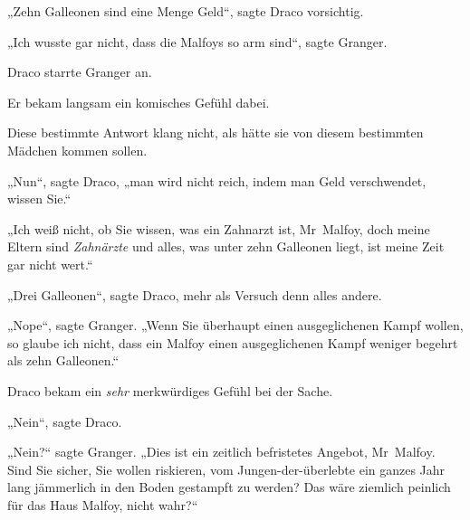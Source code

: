 „Zehn Galleonen sind eine Menge Geld“, sagte Draco vorsichtig.

„Ich wusste gar nicht, dass die Malfoys so arm sind“, sagte Granger.

Draco starrte Granger an.

Er bekam langsam ein komisches Gefühl dabei.

Diese bestimmte Antwort klang nicht, als hätte sie von diesem bestimmten Mädchen kommen sollen.

„Nun“, sagte Draco, „man wird nicht reich, indem man Geld verschwendet, wissen Sie.“

„Ich weiß nicht, ob Sie wissen, was ein Zahnarzt ist, Mr~Malfoy, doch meine Eltern sind \emph{Zahnärzte} und alles, was unter zehn Galleonen liegt, ist meine Zeit gar nicht wert.“

„Drei Galleonen“, sagte Draco, mehr als Versuch denn alles andere.

„Nope“, sagte Granger. „Wenn Sie überhaupt einen ausgeglichenen Kampf wollen, so glaube ich nicht, dass ein Malfoy einen ausgeglichenen Kampf weniger begehrt als zehn Galleonen.“

Draco bekam ein \emph{sehr} merkwürdiges Gefühl bei der Sache.

„Nein“, sagte Draco.

„Nein?“ sagte Granger. „Dies ist ein zeitlich befristetes Angebot, Mr~Malfoy. Sind Sie sicher, Sie wollen riskieren, vom Jungen-der-überlebte ein ganzes Jahr lang jämmerlich in den Boden gestampft zu werden? Das wäre ziemlich peinlich für das Haus Malfoy, nicht wahr?“

